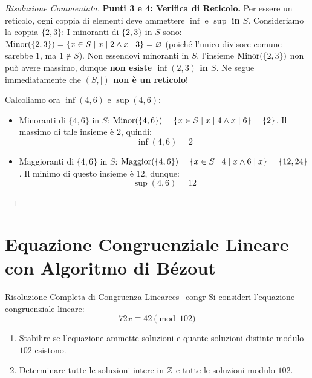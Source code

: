 \begin{proof}[Risoluzione Commentata]
\textbf{Punti 3 e 4: Verifica di Reticolo.}
Per essere un reticolo, ogni coppia di elementi deve ammettere $\inf$ e $\sup$ \textbf{in $S$}.
Consideriamo la coppia $\{2, 3\}$:
I minoranti di $\{2, 3\}$ in $S$ sono: $\operatorname{Minor}(\{2, 3\}) = \{x \in S \mid x \mid 2 \wedge x \mid 3\} = \varnothing$ (poiché l'unico divisore comune sarebbe $1$, ma $1 \notin S$).
Non essendovi minoranti in $S$, l'insieme $\operatorname{Minor}(\{2, 3\})$ non può avere massimo, dunque \textbf{non esiste $\inf(2, 3)$ in $S$}.
Ne segue immediatamente che \textbf{$(S, \mid)$ non è un reticolo}!

Calcoliamo ora $\inf(4, 6)$ e $\sup(4, 6)$:
\begin{itemize}
    \item Minoranti di $\{4, 6\}$ in $S$: $\operatorname{Minor}(\{4, 6\}) = \{x \in S \mid x \mid 4 \wedge x \mid 6\} = \{2\}$.
    Il massimo di tale insieme è $2$, quindi:
    \[
        \inf(4, 6) = 2
    \]
    \item Maggioranti di $\{4, 6\}$ in $S$: $\operatorname{Maggior}(\{4, 6\}) = \{x \in S \mid 4 \mid x \wedge 6 \mid x\} = \{12, 24\}$.
    Il minimo di questo insieme è $12$, dunque:
    \[
        \sup(4, 6) = 12
    \]
\end{itemize}
\end{proof}

\section{Equazione Congruenziale Lineare con Algoritmo di Bézout}

\begin{esercizio}{Risoluzione Completa di Congruenza Lineare}{es_congr}
Si consideri l'equazione congruenziale lineare:
\[
    72x \equiv 42 \pmod{102}
\]
\begin{enumerate}
    \item Stabilire se l'equazione ammette soluzioni e quante soluzioni distinte modulo $102$ esistono.
    \item Determinare tutte le soluzioni intere in $\mathbb{Z}$ e tutte le soluzioni modulo $102$.
\end{enumerate}
\end{esercizio}

